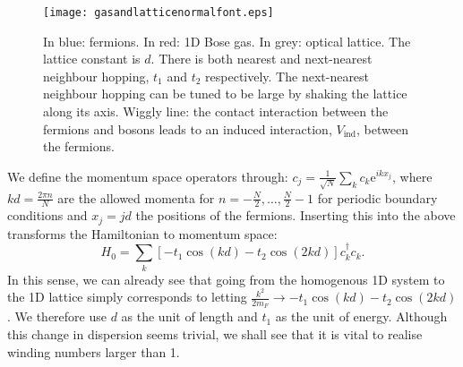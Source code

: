 \begin{figure}
\center
\texttt{[image: gasandlatticenormalfont.eps]}
\caption{In blue: fermions. In red: 1D Bose gas. In grey: optical lattice. The lattice constant is $d$. There is both nearest and next-nearest neighbour hopping, $t_1$ and $t_2$ respectively. The next-nearest neighbour hopping can be tuned to be large by shaking the lattice along its axis. Wiggly line: the contact interaction between the fermions and bosons leads to an induced interaction, $V_{\text{ind}}$, between the fermions. }
\label{fig.gasandlattice}
\end{figure}

We define the momentum space operators through: $c_j = \frac{1}{\sqrt{N}}\sum_{k} c_k \text{e}^{ikx_j}$, where $kd = \frac{2\pi n}{N}$ are the allowed momenta for $n = -\frac{N}{2}, \dots, \frac{N}{2} - 1$ for periodic boundary conditions and $x_j = jd$ the positions of the fermions. Inserting this into the above transforms the Hamiltonian to momentum space:
\begin{equation}
H_{0} = \sum_k \left[ - t_1\cos(kd) - t_2\cos(2kd)\right]c^\dagger_kc_k.
\label{eq.Htightbindingmomentumspace} 
\end{equation}
In this sense, we can already see that going from the homogenous 1D system to the 1D lattice simply corresponds to letting $\frac{k^2}{2m_F} \to - t_1\cos(kd) - t_2\cos(2kd)$. We therefore use $d$ as the unit of length and $t_1$ as the unit of energy. Although this change in dispersion seems trivial, we shall see that it is vital to realise winding numbers larger than 1. 


